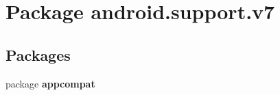 \section{Package android.\+support.\+v7}
\label{namespaceandroid_1_1support_1_1v7}
\subsection*{Packages}
\begin{DoxyCompactItemize}
\item 
package \textbf{ appcompat}
\end{DoxyCompactItemize}
